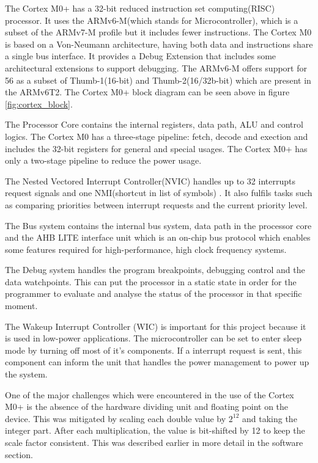 The Cortex M0+ has a 32-bit reduced instruction set computing(RISC) processor. It uses the ARMv6-M(which stands for Microcontroller), which is a subset of the ARMv7-M profile but it includes fewer instructions. The Cortex M0 is based on a Von-Neumann architecture, having both data and instructions share a single bus interface. It provides a Debug Extension that includes some architectural extensions to support debugging. The ARMv6-M offers support for 56 as a subset of  Thumb-1(16-bit) and Thumb-2(16/32b-bit) which are present in the ARMv6T2. The Cortex M0+ block diagram can be seen above in figure \ref{fig:cortex_block}. 

The Processor Core contains the internal registers, data path, ALU and control logics. The Cortex M0 has a three-stage pipeline: fetch, decode and exection and includes the 32-bit registers for general and special usages. The Cortex M0+ has only a two-stage pipeline to reduce the power usage.

The Nested Vectored Interrupt Controller(NVIC) handles up to 32 interrupts request signals and one NMI(shortcut in list of symbols) . It also fulfils tasks such as comparing priorities between  interrupt requests and the current priority level. 

The Bus system contains the internal bus system, data path in the processor core and the AHB LITE interface unit which is an on-chip bus protocol which enables some features required for high-performance, high clock frequency systems. 

The Debug system handles the program breakpoints, debugging control and the data watchpoints. This can put the processor in a  static state in order for the programmer to evaluate and analyse the status of the processor in that specific moment.

The Wakeup Interrupt Controller (WIC) is important for this project because it is used in low-power applications. The microcontroller can be set to enter sleep mode by turning off most of it's components. If a interrupt request is sent, this component can inform the unit that handles the power management to power up the system.

One of the major challenges which were encountered in the use of the Cortex M0+ is the absence of the hardware dividing unit and floating point  on the device. This was mitigated by scaling each double value by $2^{12}$ and taking the integer part. After each multiplication, the value is bit-shifted by 12 to keep the scale factor consistent. This was described earlier in more detail in the software section.

